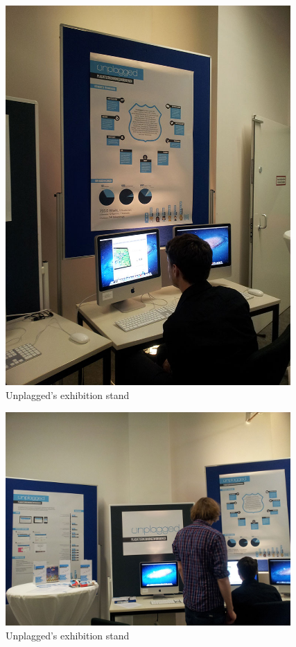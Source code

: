 \begin{figure}[!h]
  \centering
    \includegraphics[width=0.97\textwidth]{images/unplagged_exhibition_stand3.jpg}
  \caption{Unplagged's exhibition stand}
  \label{fig:unplagged_exhibition_stand3}
\end{figure}

\begin{figure}[!h]
  \centering
    \includegraphics[width=0.97\textwidth]{images/unplagged_exhibition_stand4.jpg}
  \caption{Unplagged's exhibition stand}
  \label{fig:unplagged_exhibition_stand4}
\end{figure}

\pagebreak